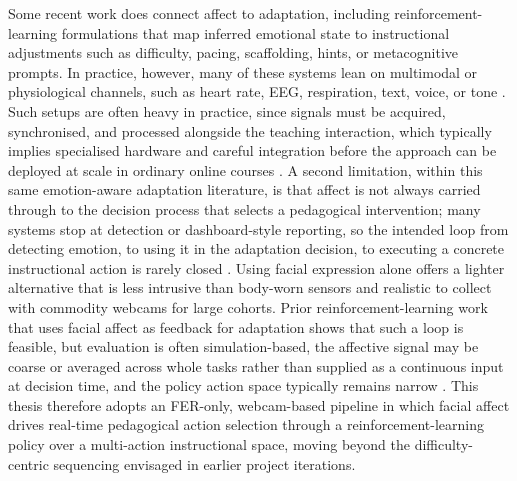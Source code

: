 Some recent work does connect affect to adaptation, including reinforcement-learning formulations that map inferred emotional state to instructional adjustments such as difficulty, pacing, scaffolding, hints, or metacognitive prompts. In practice, however, many of these systems lean on multimodal or physiological channels, such as heart rate, EEG, respiration, text, voice, or tone \cite{gong_design_2025,govea_implementation_2024}. Such setups are often heavy in practice, since signals must be acquired, synchronised, and processed alongside the teaching interaction, which typically implies specialised hardware and careful integration before the approach can be deployed at scale in ordinary online courses \cite{gutierrez_development_2025,kong_real-time_2025,nandimandalam_ai-powered_2025}. A second limitation, within this same emotion-aware adaptation literature, is that affect is not always carried through to the decision process that selects a pedagogical intervention; many systems stop at detection or dashboard-style reporting, so the intended loop from detecting emotion, to using it in the adaptation decision, to executing a concrete instructional action is rarely closed \cite{fernandez-herrero_evaluating_2024,septiana_emotion-related_2024,vistorte_integrating_2024}. Using facial expression alone offers a lighter alternative that is less intrusive than body-worn sensors and realistic to collect with commodity webcams for large cohorts. Prior reinforcement-learning work that uses facial affect as feedback for adaptation shows that such a loop is feasible, but evaluation is often simulation-based, the affective signal may be coarse or averaged across whole tasks rather than supplied as a continuous input at decision time, and the policy action space typically remains narrow \cite{perez_emotions_2024}. This thesis therefore adopts an FER-only, webcam-based pipeline in which facial affect drives real-time pedagogical action selection through a reinforcement-learning policy over a multi-action instructional space, moving beyond the difficulty-centric sequencing envisaged in earlier project iterations.

